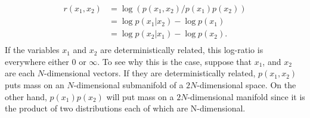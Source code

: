 %
%
%
%
%
\begin{align*}
r(x_1, x_2) &= \log \left( p(x_1, x_2) / p(x_1) p(x_2)\right) \\
&= \log p(x_1 | x_2)  - \log p(x_1) \\
&= \log p(x_2 | x_1)  - \log p(x_2). \\
\end{align*}
%
If the variables $x_1$ and $x_2$ are deterministically related, this log-ratio is everywhere either $0$ or $\infty$.
To see why this is the case, suppose that $x_1$, and $x_2$ are each $N$-dimensional vectors.
If they are deterministically related, $p(x_1, x_2)$ puts mass on an $N$-dimensional submanifold of a $2N$-dimensional space.
On the other hand, $p(x_1)p(x_2)$ will put mass on a $2N$-dimensional manifold since it is the product of two distributions each of which are N-dimensional.

